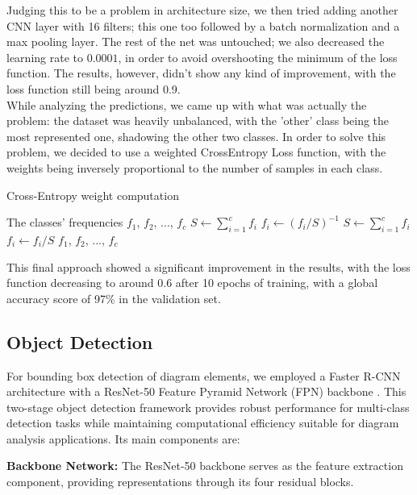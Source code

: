 \documentclass[conference]{IEEEtran}
\begin{document}
Judging this to be a problem in architecture size, we then tried adding another CNN layer with 16 filters; this one too followed by a batch normalization and a max pooling layer.
The rest of the net was untouched; we also decreased the learning rate to $0.0001$, in order to avoid overshooting the minimum of the loss function.
The results, however, didn't show any kind of improvement, with the loss function still being around 0.9.
\\

While analyzing the predictions, we came up with what was actually the problem: the dataset was heavily unbalanced, with the 'other' class being the most represented one, shadowing the other two classes.
In order to solve this problem, we decided to use a weighted CrossEntropy Loss function, with the weights being inversely proportional to the number of samples in each class.

\begin{algorithm}
	\caption{Cross-Entropy weight computation}
	\begin{algorithmic}[1]
		\REQUIRE The classes' frequencies $f_1$, $f_2$, ..., $f_c$
		\STATE $S \gets \sum_{i = 1}^c f_i$
		\STATE $f_i \gets (f_i / S)^{-1}$
		\STATE $S \gets \sum_{i = 1}^c f_i$
		\STATE $f_i \gets f_i / S$
		\RETURN $f_1$, $f_2$, ..., $f_c$
	\end{algorithmic}
\end{algorithm}

This final approach showed a significant improvement in the results, with the loss function decreasing to around 0.6 after 10 epochs of training, with a global accuracy score of 97\% in the validation set.

\subsection{Object Detection}
\label{sec:obj_det}

For bounding box detection of diagram elements, we employed a Faster R-CNN architecture \cite{rcnn} with a ResNet-50 Feature Pyramid Network (FPN) backbone \cite{lin2017feature}. This two-stage object detection framework provides robust performance for multi-class detection tasks while maintaining computational efficiency suitable for diagram analysis applications.
Its main components are:

\textbf{Backbone Network:} The ResNet-50 backbone serves as the feature extraction component, providing representations through its four residual blocks.
\end{document}
